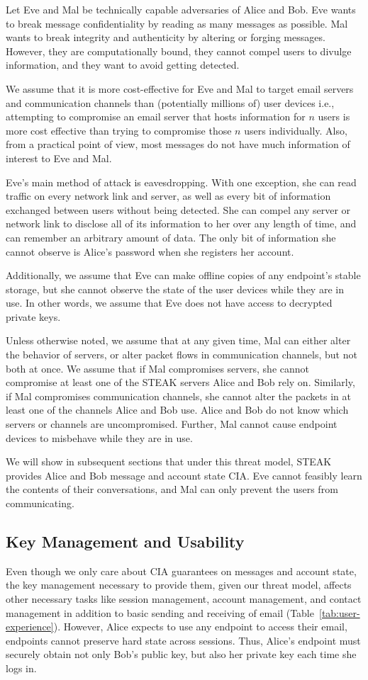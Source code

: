 Let Eve and Mal be technically capable adversaries of Alice and Bob.  Eve wants to break message confidentiality by reading as many messages as possible.  Mal wants to break integrity and authenticity by altering or forging messages.  However, they are computationally bound, they cannot compel users to divulge information, and they want to avoid getting detected.

We assume that it is more cost-effective for Eve and Mal to target email servers and communication channels than (potentially millions of) user devices i.e., attempting to compromise an email server that hosts information for $n$ users is more cost effective than trying to compromise those $n$ users individually. Also, from a practical point of view, most messages do not have much information of interest to Eve and Mal.

Eve’s main method of attack is eavesdropping.  With one exception, she can read traffic on every network link and server, as well as every bit of information exchanged between users without being detected.  She can compel any server or network link to disclose all of its information to her over any length of time, and can remember an arbitrary amount of data.  The only bit of information she cannot observe is Alice's password when she registers her account.

Additionally, we assume that Eve can make offline copies of any endpoint’s stable storage, but she cannot observe the state of the user devices while they are in use. In other words, we assume that Eve does not have access to decrypted private keys.  

Unless otherwise noted, we assume that at any given time, Mal can either alter the behavior of servers, or alter packet flows in communication channels, but not both at once. We assume that if Mal compromises servers, she cannot compromise at least one of the STEAK servers Alice and Bob rely on. Similarly, if Mal compromises communication channels, she cannot alter the packets in at least one of the channels Alice and Bob use.  Alice and Bob do not know which servers or channels are uncompromised.  Further, Mal cannot cause endpoint devices to misbehave while they are in use.

We will show in subsequent sections that under this threat model, STEAK provides Alice and Bob message and account state CIA.  Eve cannot feasibly learn the contents of their conversations, and Mal can only prevent the users from communicating.

\subsection{Key Management and Usability}
Even though we only care about CIA guarantees on messages and account 
state, the key management necessary to provide them, given our threat 
model, affects other necessary tasks like session management, account 
management, and contact management in addition to basic sending and 
receiving of email (Table~\ref{tab:user-experience}). However, Alice
expects to use any endpoint to access
their email, endpoints cannot preserve hard state across sessions.  
Thus, Alice’s endpoint must securely obtain not only Bob’s public key, 
but also her private key each time she logs in.

